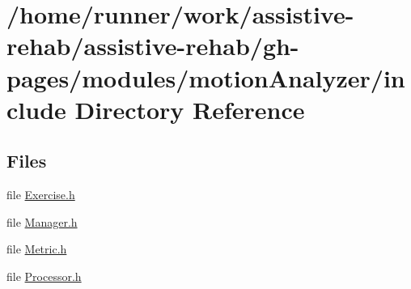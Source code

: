 \section{/home/runner/work/assistive-\/rehab/assistive-\/rehab/gh-\/pages/modules/motion\+Analyzer/include Directory Reference}
\label{dir_8d3a6da778564209f43cd2f6930ea76e}
\subsection*{Files}
\begin{DoxyCompactItemize}
\item 
file \hyperlink{Exercise_8h}{Exercise.\+h}
\item 
file \hyperlink{Manager_8h}{Manager.\+h}
\item 
file \hyperlink{Metric_8h}{Metric.\+h}
\item 
file \hyperlink{Processor_8h}{Processor.\+h}
\end{DoxyCompactItemize}
